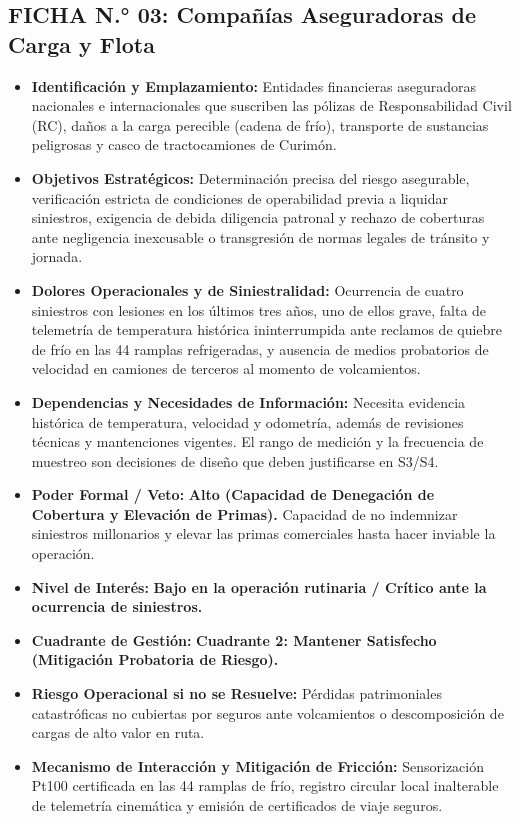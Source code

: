 \subsection*{FICHA N.° 03: Compañías Aseguradoras de Carga y Flota}
\begin{itemize}
\item \textbf{Identificación y Emplazamiento:} Entidades financieras aseguradoras nacionales e internacionales que suscriben las pólizas de Responsabilidad Civil (RC), daños a la carga perecible (cadena de frío), transporte de sustancias peligrosas y casco de tractocamiones de Curimón.
\item \textbf{Objetivos Estratégicos:} Determinación precisa del riesgo asegurable, verificación estricta de condiciones de operabilidad previa a liquidar siniestros, exigencia de debida diligencia patronal y rechazo de coberturas ante negligencia inexcusable o transgresión de normas legales de tránsito y jornada.
\item \textbf{Dolores Operacionales y de Siniestralidad:} Ocurrencia de cuatro siniestros con lesiones en los últimos tres años, uno de ellos grave, falta de telemetría de temperatura histórica ininterrumpida ante reclamos de quiebre de frío en las 44 ramplas refrigeradas, y ausencia de medios probatorios de velocidad en camiones de terceros al momento de volcamientos.
\item \textbf{Dependencias y Necesidades de Información:} Necesita evidencia histórica de temperatura, velocidad y odometría, además de revisiones técnicas y mantenciones vigentes. El rango de medición y la frecuencia de muestreo son decisiones de diseño que deben justificarse en S3/S4.
\item \textbf{Poder Formal / Veto:} \textbf{Alto (Capacidad de Denegación de Cobertura y Elevación de Primas).} Capacidad de no indemnizar siniestros millonarios y elevar las primas comerciales hasta hacer inviable la operación.
\item \textbf{Nivel de Interés:} \textbf{Bajo en la operación rutinaria / Crítico ante la ocurrencia de siniestros.}
\item \textbf{Cuadrante de Gestión:} \textbf{Cuadrante 2: Mantener Satisfecho (Mitigación Probatoria de Riesgo).}
\item \textbf{Riesgo Operacional si no se Resuelve:} Pérdidas patrimoniales catastróficas no cubiertas por seguros ante volcamientos o descomposición de cargas de alto valor en ruta.
\item \textbf{Mecanismo de Interacción y Mitigación de Fricción:} Sensorización Pt100 certificada en las 44 ramplas de frío, registro circular local inalterable de telemetría cinemática y emisión de certificados de viaje seguros.
\end{itemize}

